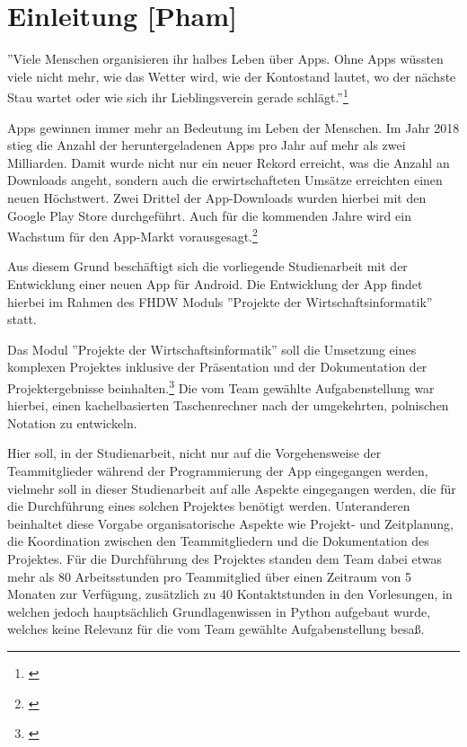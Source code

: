 
\section{Einleitung [Pham]}

''Viele Menschen organisieren ihr halbes Leben über Apps. Ohne Apps wüssten viele nicht mehr, wie das Wetter wird, wie der Kontostand lautet, wo der nächste Stau wartet oder wie sich ihr Lieblingsverein gerade schlägt.''\footnote{\cite[Berg, zitiert nach][]{rondinella2019}}

Apps gewinnen immer mehr an Bedeutung im Leben der Menschen. Im Jahr 2018 stieg die Anzahl der heruntergeladenen Apps pro Jahr auf mehr als zwei Milliarden. Damit wurde nicht nur ein neuer Rekord erreicht, was die Anzahl an Downloads angeht, sondern auch die erwirtschafteten Umsätze erreichten einen neuen Höchstwert. Zwei Drittel der App-Downloads wurden hierbei mit den Google Play Store durchgeführt. Auch für die kommenden Jahre wird ein Wachstum für den App-Markt vorausgesagt.\footnote{\cite[vgl.][]{rondinella2019}}

Aus diesem Grund beschäftigt sich die vorliegende Studienarbeit mit der Entwicklung einer neuen App für Android. Die Entwicklung der App findet hierbei im Rahmen des FHDW Moduls ''Projekte der Wirtschaftsinformatik'' statt.

Das Modul ''Projekte der Wirtschaftsinformatik'' soll die Umsetzung eines komplexen Projektes inklusive der Präsentation und der Dokumentation der Projektergebnisse beinhalten.\footnote{\cite[vgl.][]{fhdw2020}}  Die vom Team gewählte Aufgabenstellung war hierbei, einen kachelbasierten Taschenrechner nach der umgekehrten, polnischen Notation zu entwickeln. 

Hier soll, in der Studienarbeit, nicht nur auf die Vorgehensweise der Teammitglieder während der Programmierung der App eingegangen werden, vielmehr soll in dieser Studienarbeit auf alle Aspekte eingegangen werden, die für die Durchführung eines solchen Projektes benötigt werden. Unteranderen beinhaltet diese Vorgabe organisatorische Aspekte wie Projekt- und Zeitplanung, die Koordination zwischen den Teammitgliedern und die Dokumentation des Projektes. Für die Durchführung des Projektes standen dem Team dabei etwas mehr als 80 Arbeitsstunden pro Teammitglied über einen Zeitraum von 5 Monaten zur Verfügung, zusätzlich zu 40 Kontaktstunden in den Vorlesungen, in welchen jedoch hauptsächlich Grundlagenwissen in Python aufgebaut wurde, welches keine Relevanz für die vom Team gewählte Aufgabenstellung besaß. 